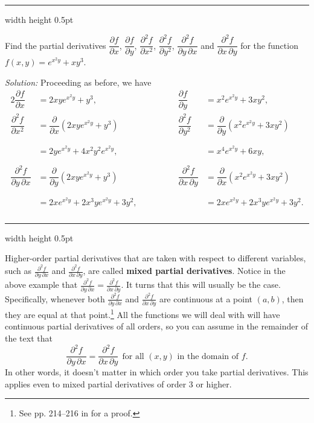 \vspace{3mm}
\hrule width \textwidth height 0.5pt
\begin{exmp}
 Find the partial derivatives $\dfrac{\partial f}{\partial x}$, $\dfrac{\partial f}{\partial y}$,
 $\dfrac{\partial^2 f}{\partial x^2}$,
 $\dfrac{\partial^2 f}{\partial y^2}$, $\dfrac{\partial^2 f}{\partial y \, \partial x}$ and
 $\dfrac{\partial^2 f}{\partial x \, \partial y}$ for the function
 $f(x,y) = e^{x^2 y} + xy^3$.\vspace{1mm}
 \par\noindent\emph{Solution:} Proceeding as before, we have
 \begin{alignat*}{2}
  \dfrac{\partial f}{\partial x} &= 2xy e^{x^2 y} + y^3,
  \qquad\qquad
  & \dfrac{\partial f}{\partial y} &= x^2 e^{x^2 y} + 3xy^2,
  \\
  \dfrac{\partial^2 f}{\partial x^2} &= \dfrac{\partial}{\partial x} (2xy e^{x^2 y} + y^3)\qquad\qquad
  & \dfrac{\partial^2 f}{\partial y^2} &= \dfrac{\partial}{\partial y} (x^2 e^{x^2 y} + 3xy^2)
  \\
  \phantom{\dfrac{\partial^2 f}{\partial x^2}} &= 2y e^{x^2 y} + 4x^2 y^2 e^{x^2 y},
  \qquad\qquad
   & \phantom{\dfrac{\partial^2 f}{\partial y^2}} &= x^4 e^{x^2 y} + 6xy,
   \\
  \dfrac{\partial^2 f}{\partial y \, \partial x} &= \dfrac{\partial}{\partial y} (2xy e^{x^2 y} + y^3)
  \qquad\qquad
  & \dfrac{\partial^2 f}{\partial x \, \partial y} &= \dfrac{\partial}{\partial x} (x^2 e^{x^2 y} + 3xy^2)
  \\
  \phantom{\dfrac{\partial^2 f}{\partial y \, \partial x}} &= 2x e^{x^2 y} + 2x^3 y e^{x^2 y} + 3y^2,
  \qquad\qquad
   & \phantom{\dfrac{\partial^2 f}{\partial x \, \partial y}} &= 2x e^{x^2 y} + 2x^3 y e^{x^2 y} + 3y^2.
 \end{alignat*}
\end{exmp}
\hrule width \textwidth height 0.5pt
\vspace{3mm}

Higher-order partial derivatives that are taken with respect to different variables, such as
$\frac{\partial^2 f}{\partial y \, \partial x}$ and $\frac{\partial^2 f}{\partial x \, \partial y}$, are called
\textbf{mixed partial derivatives}.
Notice in the above example that $\frac{\partial^2 f}{\partial y \, \partial x} =
\frac{\partial^2 f}{\partial x \, \partial y}$. It turns that this will usually be the case. Specifically,
whenever both $\frac{\partial^2 f}{\partial y \, \partial x}$ and $\frac{\partial^2 f}{\partial x \, \partial y}$ are
continuous at a point $(a,b)$, then they are equal at that point.\footnote{See pp. 214--216
in \cite{tm} for a proof.} All the functions we will deal with will have continuous partial derivatives of all
orders, so you can assume in the remainder of the text that
\begin{displaymath}
 \frac{\partial^2 f}{\partial y \, \partial x} = \frac{\partial^2 f}{\partial x \, \partial y} ~~
 \text{for all $(x,y)$ in the domain of $f$.}
\end{displaymath}
In other words, it doesn't matter
in which order you take partial derivatives. This applies even to mixed partial derivatives of order $3$ or higher.

